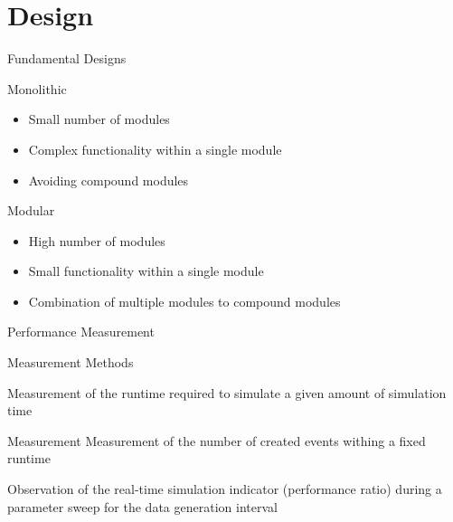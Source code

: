 \section{Design}
\begin{frame}{Fundamental Designs}
    \begin{block}{Monolithic}
        \begin{itemize}
            \item Small number of modules
            \item Complex functionality within a single module
            \item Avoiding compound modules
        \end{itemize}
    \end{block}
    \begin{block}{Modular}
        \begin{itemize}
            \item High number of modules
            \item Small functionality within a single module
            \item Combination of multiple modules to compound modules
        \end{itemize}
    \end{block}
\end{frame}

\begin{frame}{Performance Measurement}
    \begin{block}{Measurement Methods}
        \begin{description}
            \item[runtime] Measurement of the runtime required to simulate a given amount of simulation time
            \item[created events] Measurement Measurement of the number of created events withing a fixed runtime
            \item[real-time] Observation of the real-time simulation indicator (performance ratio) during a parameter sweep for the data generation interval
        \end{description}
    \end{block}
\end{frame}

